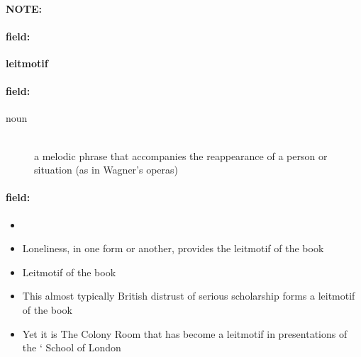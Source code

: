\documentclass[12pt]{article}
\newenvironment{note}{\paragraph{NOTE:}}{}
\newenvironment{field}{\paragraph{field:}}{}
\begin{document}
\begin{note}
\begin{field}
\textbf{\large leitmotif}
\end{field}


\begin{field}
\begin{description}
\item[noun] \hfill \\ 
a melodic phrase that accompanies the reappearance of a person or situation (as in Wagner's operas)

\end{description}
\end{field}

\begin{field}
\begin{itemize}
\item 
\item Loneliness, in one form or another, provides the leitmotif of the book
\item Leitmotif of the book
\item This almost typically British distrust of serious scholarship forms a leitmotif of the book
\item Yet it is The Colony Room that has become a leitmotif in presentations of the ` School of London 
\end{itemize}
\end{field}
\end{note}
\end{document}
